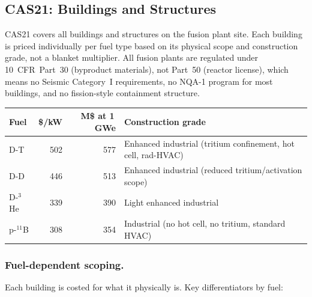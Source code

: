 \documentclass{article}
\begin{document}
\subsection{CAS21: Buildings and Structures}
\label{sec:cas21}

CAS21 covers all buildings and structures on the fusion plant site.
Each building is priced individually per fuel type based on its
physical scope and construction grade, not a blanket multiplier.
All fusion plants are regulated under 10~CFR~Part~30 (byproduct
materials), not Part~50 (reactor license), which means no Seismic
Category~I requirements, no NQA-1 program for most buildings, and
no fission-style containment structure.

\begin{center}
\begin{tabular}{lrrl}
\toprule
Fuel & \$/kW & M\$ at 1\,GWe & Construction grade \\
\midrule
D-T    & 502 & 577 & Enhanced industrial (tritium confinement, hot cell, rad-HVAC) \\
D-D    & 446 & 513 & Enhanced industrial (reduced tritium/activation scope) \\
D-${}^3$He & 339 & 390 & Light enhanced industrial \\
p-${}^{11}$B & 308 & 354 & Industrial (no hot cell, no tritium, standard HVAC) \\
\bottomrule
\end{tabular}
\end{center}

\subsubsection{Fuel-dependent scoping.}
Each building is costed for what it physically is.  Key
differentiators by fuel:
\end{document}

